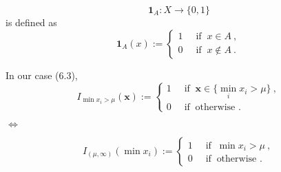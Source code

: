 \documentclass[11pt]{article}
\begin{document}
$$\mathbf{1}_A \colon X \to \{ 0, 1 \}$$
is defined as 
\begin{equation*}
  \mathbf{1}_A(x) :=
\begin{cases}
1 ~&\text{ if }~ x \in A~, \\
0 ~&\text{ if }~ x \notin A~.
\end{cases}  
\end{equation*}


In our case (6.3), 
\begin{equation*}
  I_{\min x_i > \mu} (\boldsymbol x) :=
\begin{cases}
1 ~&\text{ if }~ \boldsymbol x \in \{\min \limits_i x_i > \mu\} ~, \\
0 ~&\text{ if }~ \textrm{otherwise }.
\end{cases}  
\end{equation*}

$\Leftrightarrow$

\begin{equation*}
  I_{(\mu, \infty)} (\min x_i) :=
\begin{cases}
1 ~&\text{ if }~ \min x_i > \mu ~, \\
0 ~&\text{ if }~ \textrm{otherwise }.
\end{cases}  
\end{equation*}
\end{document}
